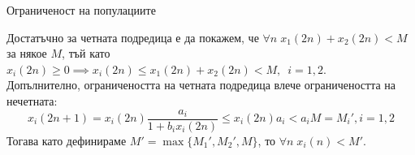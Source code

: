 \begin{frame}[t]{Ограниченост на популациите}

  Достатъчно за четната подредица е да покажем, че $\forall{n} \; x_{1} \left(2n \right) + x_{2} \left(2n \right) < M$ за някое $M$, тъй като $x_{i} \left(2n \right) \geq 0 \implies x_{i} \left(2n \right) \leq x_{1} \left(2n \right) + x_{2} \left(2n \right) < M, \enspace i=1,2$. \\
  Допълнително, ограничеността на четната подредица влече ограничеността на нечетната:
  \[x_{i} \left(2n+1 \right) = x_{i} \left(2n \right) \frac{a_{i}}{1 + b_{i} x_{i} \left(2n \right)} \leq x_{i} \left(2n \right) a_{i} < a_{i} M = M_{i}', i=1, 2\]
  Тогава като дефинираме
  $M' = \max \{M_{1}',M_{2}',M\}$, то $\forall{n} \; x_{i} \left(n  \right) < M'$. \\

\end{frame}

